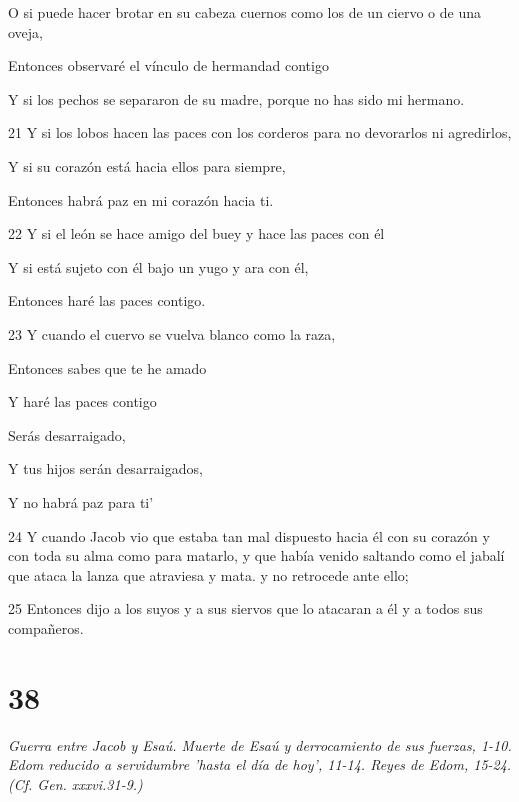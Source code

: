\par     O si puede hacer brotar en su cabeza cuernos como los de un ciervo o de una oveja,  
\par     Entonces observaré el vínculo de hermandad contigo  
\par     Y si los pechos se separaron de su madre, porque no has sido mi hermano.  
\par    
\par 21 Y si los lobos hacen las paces con los corderos para no devorarlos ni agredirlos,  
\par     Y si su corazón está hacia ellos para siempre,  
\par     Entonces habrá paz en mi corazón hacia ti.
\par    
\par 22 Y si el león se hace amigo del buey y hace las paces con él  
\par     Y si está sujeto con él bajo un yugo y ara con él,  
\par     Entonces haré las paces contigo.  
\par    
\par 23 Y cuando el cuervo se vuelva blanco como la raza,  
\par     Entonces sabes que te he amado  
\par     Y haré las paces contigo  
\par     Serás desarraigado,  
\par     Y tus hijos serán desarraigados,  
\par     Y no habrá paz para ti'
\par    
\par 24 Y cuando Jacob vio que estaba tan mal dispuesto hacia él con su corazón y con toda su alma como para matarlo, y que había venido saltando como el jabalí que ataca la lanza que atraviesa y mata. y no retrocede ante ello;
\par 25 Entonces dijo a los suyos y a sus siervos que lo atacaran a él y a todos sus compañeros.

\chapter{38}

\par \textit{Guerra entre Jacob y Esaú. Muerte de Esaú y derrocamiento de sus fuerzas, 1-10. Edom reducido a servidumbre 'hasta el día de hoy', 11-14. Reyes de Edom, 15-24. (Cf. Gen. xxxvi.31-9.)}

